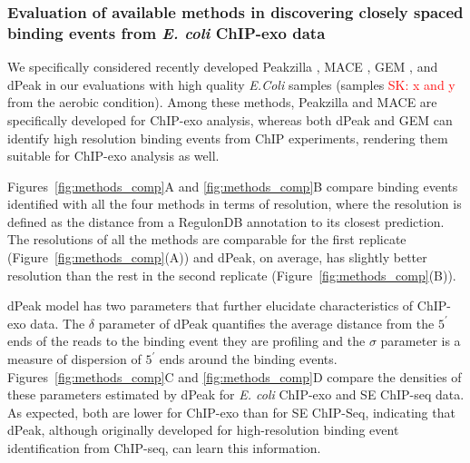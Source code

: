 \documentclass{bmcart}
\newcommand{\SK}[1]{\textcolor{red}{SK: #1}}
\begin{document}
\subsubsection*{Evaluation of available methods in discovering closely
  spaced binding events from \textit{E. coli} ChIP-exo  data}

We specifically considered recently developed Peakzilla \cite{peakzilla}, MACE
\cite{mace}, GEM \cite{gem}, and dPeak \cite{dpeak} in our evaluations with 
high quality \emph{E.Coli} samples (samples \SK{x and y} from the aerobic condition). Among these methods, Peakzilla and MACE are specifically developed for ChIP-exo analysis, whereas both dPeak and GEM can identify high resolution binding events from ChIP experiments, rendering them suitable for ChIP-exo analysis as well. 

Figures~\ref{fig:methods_comp}A and \ref{fig:methods_comp}B compare
binding events identified with all the four methods  in terms of resolution,
where the resolution is defined as the distance from a RegulonDB \cite{regulondb}
annotation to its closest prediction. The resolutions of  all the methods
are comparable for the first replicate (Figure~\ref{fig:methods_comp}(A)) and dPeak, on average, has slightly better resolution than the rest in the second replicate (Figure~\ref{fig:methods_comp}(B)). 

dPeak model  has two parameters that further elucidate characteristics of ChIP-exo data.
The $\delta$ parameter of dPeak quantifies the average distance from the
$5^{\prime}$ ends of the reads to the binding event they are profiling and the $\sigma$
parameter is a measure of dispersion of $5^{\prime}$ ends around the binding events.
Figures~\ref{fig:methods_comp}C and
\ref{fig:methods_comp}D compare the densities of these parameters
estimated by dPeak for \textit{E. coli}  ChIP-exo and SE ChIP-seq data. As expected, 
both   are lower for ChIP-exo than for SE
ChIP-Seq, indicating that dPeak, although originally developed for high-resolution binding event identification from ChIP-seq, can learn this information.
\end{document}
